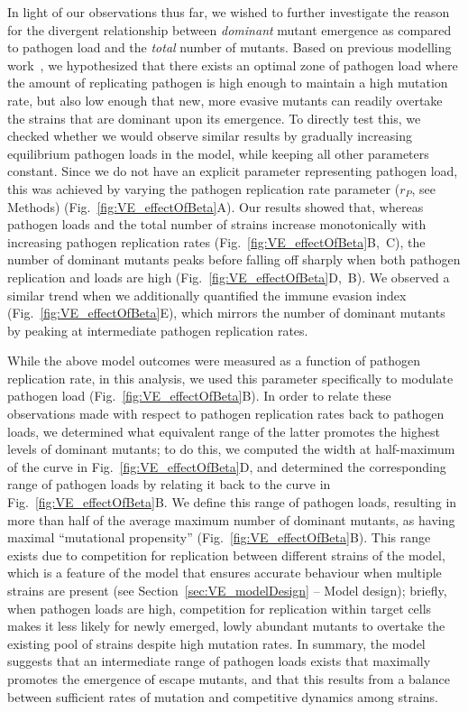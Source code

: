 In light of our observations thus far, we wished to further investigate the reason for the divergent relationship between \textit{dominant} mutant emergence as compared to pathogen load and the \textit{total} number of mutants. Based on previous modelling work~\cite{grenfell2004unifying}, we hypothesized that there exists an optimal zone of pathogen load where the amount of replicating pathogen is high enough to maintain a high mutation rate, but also low enough that new, more evasive mutants can readily overtake the strains that are dominant upon its emergence. To directly test this, we checked whether we would observe similar results by gradually increasing equilibrium pathogen loads in the model, while keeping all other parameters constant. Since we do not have an explicit parameter representing pathogen load, this was achieved by varying the pathogen replication rate parameter ($r_P$, see Methods) (Fig.~\ref{fig:VE_effectOfBeta}A). Our results showed that, whereas pathogen loads and the total number of strains increase monotonically with increasing pathogen replication rates (Fig.~\ref{fig:VE_effectOfBeta}B,~C), the number of dominant mutants peaks before falling off sharply when both pathogen replication and loads are high (Fig.~\ref{fig:VE_effectOfBeta}D,~B). We observed a similar trend when we additionally quantified the immune evasion index (Fig.~\ref{fig:VE_effectOfBeta}E), which mirrors the number of dominant mutants by peaking at intermediate pathogen replication rates.

While the above model outcomes were measured as a function of pathogen replication rate, in this analysis, we used this parameter specifically to modulate pathogen load (Fig.~\ref{fig:VE_effectOfBeta}B). In order to relate these observations made with respect to pathogen replication rates back to pathogen loads, we determined what equivalent range of the latter promotes the highest levels of dominant mutants; to do this, we computed the width at half-maximum of the curve in Fig.~\ref{fig:VE_effectOfBeta}D, and determined the corresponding range of pathogen loads by relating it back to the curve in Fig.~\ref{fig:VE_effectOfBeta}B. We define this range of pathogen loads, resulting in more than half of the average maximum number of dominant mutants, as having maximal ``mutational propensity'' (Fig.~\ref{fig:VE_effectOfBeta}B). This range exists due to competition for replication between different strains of the model, which is a feature of the model that ensures accurate behaviour when multiple strains are present (see Section~\ref{sec:VE_modelDesign} -- Model design); briefly, when pathogen loads are high, competition for replication within target cells makes it less likely for newly emerged, lowly abundant mutants to overtake the existing pool of strains despite high mutation rates. In summary, the model suggests that an intermediate range of pathogen loads exists that maximally promotes the emergence of escape mutants, and that this results from a balance between sufficient rates of mutation and competitive dynamics among strains.

